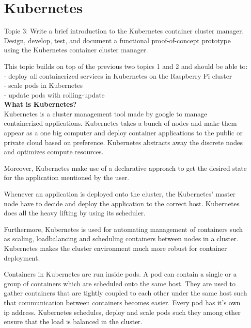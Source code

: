 \chapter{Kubernetes}\label{ch:kubernetes}
Topic 3: Write a brief introduction to the Kubernetes container cluster manager. 
Design, develop, test, and document a functional proof-of-concept prototype using the Kubernetes container cluster manager. 

This topic builds on top of the previous two topics 1 and 2 and should be able to:\\
- deploy all containerized services in Kubernetes on the Raspberry Pi cluster \\
- scale pods in Kubernetes \\
- update pods with rolling-update \\

\textbf{What is Kubernetes?}\\
Kubernetes is a cluster management tool made by google to manage containerized applications. Kubernetes takes a bunch of nodes and make them appear as a one big computer and deploy container applications to the public or private cloud based on preference. Kubernetes abstracts away the discrete nodes and optimizes compute resources.  

Moreover, Kubernetes make use of a declarative approach to get the desired state for the application mentioned by the user. 

Whenever an application is deployed onto the cluster, the Kubernetes' master node have to decide and deploy the application to the correct host. Kubernetes does all the heavy lifting by using its scheduler. 

Furthermore, Kubernetes is used for automating management of containers such as scaling, loadbalancing and scheduling containers between nodes in a cluster. Kubernetes makes the cluster environment much more robust for container deployment.

Containers in Kubernetes are run inside pods. A pod can contain a single or a group of containers which are scheduled onto the same host. They are used to gather containers that are tightly coupled to each other under the same host such that communication between containers becomes easier. Every pod has it's own ip address. Kubernetes schedules, deploy and scale pods such they among other ensure that the load is balanced in the cluster. 

